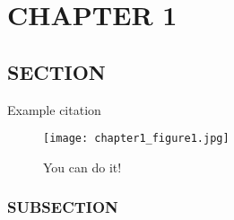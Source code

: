 \documentclass[../main/main]{subfiles}
\begin{document}
\chapter{CHAPTER 1}

\section{SECTION}
Example citation~\cite{dworkin2011justice}

\begin{figure}[H]
\centering
	\texttt{[image: chapter1\_figure1.jpg]}
	\caption{You can do it!}
\end{figure}



\subsection{SUBSECTION}

\printbibliography
\end{document}

